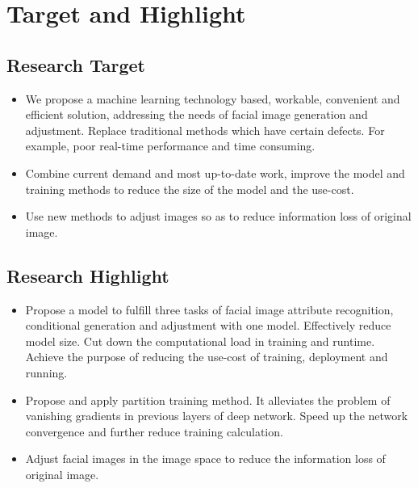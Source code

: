 \section{Target and Highlight}

\subsection{Research Target}
\begin{itemize}
\item We propose a machine learning technology based, workable, convenient and efficient solution,
    addressing the needs of facial image generation and adjustment.
    Replace traditional methods which have certain defects.
    For example, poor real-time performance and time consuming.
\item Combine current demand and most up-to-date work, 
    improve the model and training methods to reduce the size of the model and the use-cost.
\item Use new methods to adjust images so as to reduce information loss of original image.
\end{itemize}
\subsection{Research Highlight}
\begin{itemize}
\item Propose a model to fulfill three tasks of facial image attribute recognition,
    conditional generation and adjustment with one model.
    Effectively reduce model size.
    Cut down the computational load in training and runtime.
    Achieve the purpose of reducing the use-cost of training, deployment and running.
\item Propose and apply partition training method.
    It alleviates the problem of vanishing gradients in previous layers of deep network.
    Speed up the network convergence and further reduce training calculation.

\item Adjust facial images in the image space to reduce the information loss of original image.
\end{itemize}